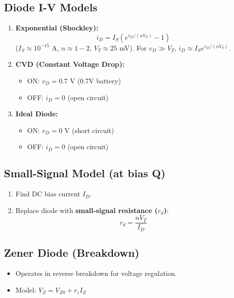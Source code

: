 \documentclass[10pt]{article}
\begin{document}
\begin{multicols*}{2}
\subsection*{Diode I-V Models}
\begin{enumerate}\itemsep0pt
    \item \textbf{Exponential (Shockley):}
    \[ i_D = I_S (e^{v_D / (nV_T)} - 1) \]
    ($I_S \approx 10^{-15}$ A, $n \approx 1-2$, $V_T \approx 25$ mV).
    For $v_D \gg V_T$, $i_D \approx I_S e^{v_D / (nV_T)}$.
    
    \item \textbf{CVD (Constant Voltage Drop):}
    \begin{itemize}\itemsep0pt
        \item ON: $v_D = 0.7 \text{ V}$ (0.7V battery)
        \item OFF: $i_D = 0$ (open circuit)
    \end{itemize}
    
    \item \textbf{Ideal Diode:}
    \begin{itemize}\itemsep0pt
        \item ON: $v_D = 0 \text{ V}$ (short circuit)
        \item OFF: $i_D = 0$ (open circuit)
    \end{itemize}
\end{enumerate}

\subsection*{Small-Signal Model (at bias Q)}
\begin{enumerate}\itemsep0pt
    \item Find DC bias current $I_D$.
    \item Replace diode with \textbf{small-signal resistance ($r_d$)}:
    \[ r_d = \frac{nV_T}{I_D} \]
\end{enumerate}

\subsection*{Zener Diode (Breakdown)}
\begin{itemize}\itemsep0pt
    \item Operates in reverse breakdown for voltage regulation.
    \item Model: $V_Z = V_{Z0} + r_z I_Z$
\end{itemize}


\end{multicols*}
\end{document}
